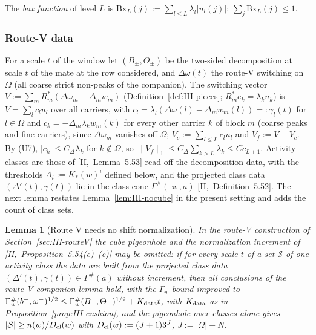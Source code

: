\documentclass[10pt]{amsart}
\newtheorem{lemma}[theorem]{Lemma}
\theoremstyle{definition}
\theoremstyle{remark}
\begin{document}
The \emph{box function} of level $L$ is $\mathrm{Bx}_L(j):=\sum_{l\le L}
\lambda_l|u_l(j)|$; $\sum_j\mathrm{Bx}_L(j)\le1$.

\subsubsection*{Route-V data}
For a scale $t$ of the window let $(B_\pm,\Theta_\pm)$ be the two-sided
decomposition at scale $t$ of the mate at the row considered, and
$\Delta\omega(t)$ the route-V switching on $\Omega$ (all coarse strict
non-peaks of the companion).  The switching vector
$V:=\sum_mR_m^*(\Delta\omega_m-\Delta_mw_m)$ (Definition~\ref{def:III-pieces};
$R_m^*e_k=\lambda_ku_k$) is $V=\sum_lc_lu_l$ over all carriers, with
$c_l=\lambda_l(\Delta\omega(l)-\Delta_mw_m(l))=:\gamma_l(t)$ for $l\in\Omega$
and $c_k=-\Delta_m\lambda_kw_m(k)$ for every other carrier $k$ of block $m$
(coarse peaks and fine carriers), since $\Delta\omega_m$ vanishes off
$\Omega$; $V_c:=\sum_{l\le L}c_lu_l$ and $V_f:=V-V_c$.  By (U7),
$|c_k|\le C_\Delta\lambda_k$ for $k\notin\Omega$, so $\|V_f\|_1\le
C_\Delta\sum_{k>L}\lambda_k\le Cc_{L+1}$.  Activity classes are those of
[II,~Lemma~5.53] read off the decomposition data, with the thresholds
$A_i:=K_*(w)^i$ defined below, and the projected class data
$(\Delta'(t),\gamma(t))$ lie in the class cone $\Gamma^\#(\varkappa,a)$
[II,~Definition~5.52].  The next lemma restates Lemma~\ref{lem:III-nocube} in the present setting and adds the count of class sets.

\begin{lemma}[Route V needs no shift normalization]\label{lem:III-nocubeinf}
In the route-V construction of Section~\textup{\ref{sec:III-routeV}} the cube
pigeonhole and the normalization increment of
[II,~Proposition~5.54(c)--(e)] may be omitted: if for every scale $t$ of a set
$\mathcal S$ of one activity class the data are built from the projected class
data $(\Delta'(t),\gamma(t))\in\Gamma^\#(a)$ without increment, then all
conclusions of the route-V companion lemma hold, with the $\Gamma_w$-bound
improved to $\Gamma^\#_w(b^-,\omega^-)^{1/2}\le\Gamma^\#_w(B_-,\Theta_-)^{1/2}+
K_{\rm data}t$, with $K_{\rm data}$ as in Proposition~\ref{prop:III-cushion},
and the pigeonhole over classes alone gives $|\mathcal S|\ge n(w)/D_{\rm cl}(w)$
with $D_{\rm cl}(w):=(J+1)3^J$, $J:=|\Omega|+N$.
\end{lemma}
\end{document}
